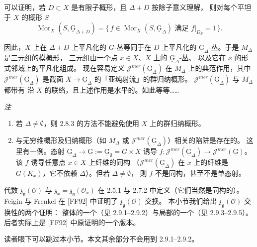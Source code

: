 可以证明，若 $D\subset X$ 是有限子概形，且 $\Delta+D$ 按除子意义理解，
则对每个平坦于 $X$ 的概形 $S$
\[
  \operatorname{Mor}_X(S,\underline{\mathrm{G}}_{\Delta+D})
  =\{\,f\in\operatorname{Mor}_X(S,\underline{\mathrm{G}}_\Delta)
  \text{ 满足 } f|_{D_S}=1\,\}.
\]

因此，$X$ 上在 $\Delta+D$ 上平凡化的 $G$-丛等同于在 $D$ 上平凡化的
$\underline{\mathrm{G}}_\Delta$-丛。于是 $M_\Delta$ 是三元组的模概形，
三元组由一个点 $x\in X$、$X$ 上的 $\underline{\mathrm{G}}_\Delta$-丛、
以及它在 $x$ 的形式邻域上的平凡化组成。
现在容易定义 $\mathcal{J}^{mer}(\underline{\mathrm{G}}_\Delta)$
在 $M_\Delta$ 上的典范作用，其中
$\mathcal{J}^{mer}(\underline{\mathrm{G}}_\Delta)$ 是截面
$X\to\underline{\mathrm{G}}_\Delta$ 的「亚纯射流」的群归纳概形。
$\mathcal{J}^{mer}(\underline{\mathrm{G}}_\Delta)$ 与 $M_\Delta$ 都带有
沿 $X$ 的联络，且上述作用是水平的。如此等等……

\emph{注}

\begin{enumerate}[label=(\roman*),leftmargin=2.6em]
\item 若 $\Delta\neq\emptyset$，则 2.8.3 的方法不能避免使用 $X$ 上的群归纳概形。
\item 与无穷维概形及归纳概形（如 $M_\Delta$ 或
  $\mathcal{J}^{mer}(\underline{\mathrm{G}}_\Delta)$）相关的陷阱是存在的。
  这里有一例。态射
  $\underline{\mathrm{G}}_\Delta\to\underline{\mathrm{G}}
  :=\underline{\mathrm{G}}_\emptyset=G\times X$ 诱导
  $f:\mathcal{J}^{mer}(\underline{\mathrm{G}}_\Delta)\to
  \mathcal{J}^{mer}(\underline{\mathrm{G}})$。
  该 $f$ 诱导任意点 $x\in X$ 上纤维的同构
  （$\mathcal{J}^{mer}(\underline{\mathrm{G}}_\Delta)$ 在 $x$ 上的纤维是
  $G(K_x)$，它不依赖 $\Delta$）。但若 $\Delta\neq\emptyset$，
  则 $f$ 不是同构，甚至不是单态射。
\end{enumerate}

代数 $\mathfrak{z}_{\mathfrak{g}}(\mathcal{O})$ 与
$\mathfrak{z}_x=\mathfrak{z}_{\mathfrak{g}}(\mathcal{O}_x)$ 在 2.5.1 与 2.7.2
中定义（它们当然是同构的）。Feigin 与 Frenkel 在 [FF92] 中证明了
$\mathfrak{z}_{\mathfrak{g}}(\mathcal{O})$ 交换。
本小节我们给出 $\mathfrak{z}_{\mathfrak{g}}(\mathcal{O})$ 交换性的两个证明：
整体的一个（见 2.9.1--2.9.2）与局部的一个（见 2.9.3--2.9.5）。
后者实际上是 [FF92] 中原证明的一个版本。


读者眼下可以跳过本小节。本文其余部分不会用到 2.9.1--2.9.2。

